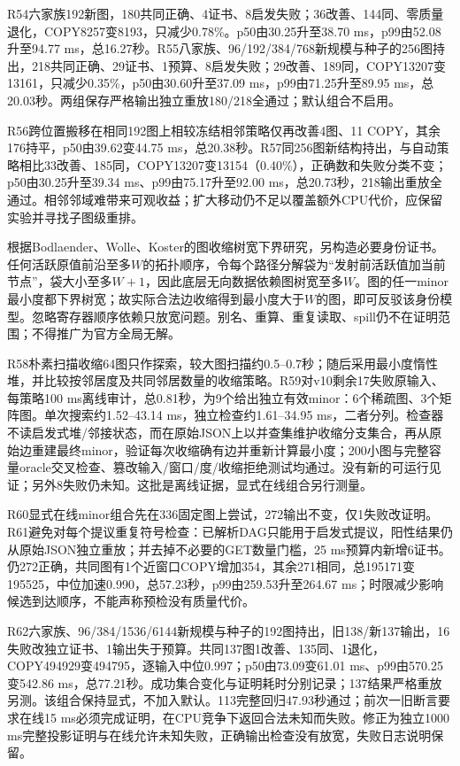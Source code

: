 \documentclass[UTF8,11pt,fontset=fandol]{ctexart}
\begin{document}
R54六家族192新图，180共同正确、4证书、8启发失败；36改善、144同、零质量退化，COPY8257变8193，只减少0.78\%。p50由30.25升至38.70 ms，p99由52.08升至94.77 ms，总16.27秒。R55八家族、96/192/384/768新规模与种子的256图持出，218共同正确、29证书、1预算、8启发失败；29改善、189同，COPY13207变13161，只减少0.35\%，p50由30.60升至37.09 ms，p99由71.25升至89.95 ms，总20.03秒。两组保存严格输出独立重放180/218全通过；默认组合不启用。

R56跨位置搬移在相同192图上相较冻结相邻策略仅再改善4图、11 COPY，其余176持平，p50由39.62变44.75 ms，总20.38秒。R57同256图新结构持出，与自动策略相比33改善、185同，COPY13207变13154（0.40\%），正确数和失败分类不变；p50由30.25升至39.34 ms、p99由75.17升至92.00 ms，总20.73秒，218输出重放全通过。相邻邻域难带来可观收益；扩大移动仍不足以覆盖额外CPU代价，应保留实验并寻找子图级重排。

根据Bodlaender、Wolle、Koster的图收缩树宽下界研究\cite{minor}，另构造必要身份证书。任何活跃原值前沿至多$W$的拓扑顺序，令每个路径分解袋为“发射前活跃值加当前节点”，袋大小至多$W+1$，因此底层无向数据依赖图树宽至多$W$。图的任一minor最小度都下界树宽；故实际合法边收缩得到最小度大于$W$的图，即可反驳该身份模型。忽略寄存器顺序依赖只放宽问题。别名、重算、重复读取、spill仍不在证明范围；不得推广为官方全局无解。

R58朴素扫描收缩64图只作探索，较大图扫描约0.5--0.7秒；随后采用最小度惰性堆，并比较按邻居度及共同邻居数量的收缩策略。R59对v10剩余17失败原输入、每策略100 ms离线审计，总0.81秒，为9个给出独立有效minor：6个稀疏图、3个矩阵图。单次搜索约1.52--43.14 ms，独立检查约1.61--34.95 ms，二者分列。检查器不读启发式堆/邻接状态，而在原始JSON上以并查集维护收缩分支集合，再从原始边重建最终minor，验证每次收缩确有边并重新计算最小度；200小图与完整容量oracle交叉检查、篡改输入/窗口/度/收缩拒绝测试均通过。没有新的可运行见证；另外8失败仍未知。这批是离线证据，显式在线组合另行测量。

R60显式在线minor组合先在336固定图上尝试，272输出不变，仅1失败改证明。R61避免对每个提议重复符号检查：已解析DAG只能用于启发式提议，阳性结果仍从原始JSON独立重放；并去掉不必要的GET数量门槛，25 ms预算内新增6证书。仍272正确，共同图有1个近窗口COPY增加354，其余271相同，总195171变195525，中位加速0.990，总57.23秒，p99由259.53升至264.67 ms；时限减少影响候选到达顺序，不能声称预检没有质量代价。

R62六家族、96/384/1536/6144新规模与种子的192图持出，旧138/新137输出，16失败改独立证书、1输出失于预算。共同137图1改善、135同、1退化，COPY494929变494795，逐输入中位0.997；p50由73.09变61.01 ms、p99由570.25变542.86 ms，总77.21秒。成功集合变化与证明耗时分别记录；137结果严格重放另测。该组合保持显式，不加入默认。113完整回归47.93秒通过；前次一旧断言要求在线15 ms必须完成证明，在CPU竞争下返回合法未知而失败。修正为独立1000 ms完整投影证明与在线允许未知失败，正确输出检查没有放宽，失败日志说明保留。
\end{document}
